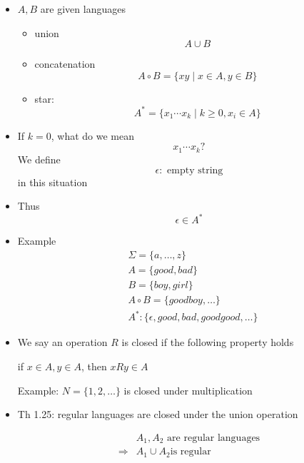 \begin{frame}[allowframebreaks]
\begin{itemize}
\item [] $A,B$ are given languages
\begin{itemize}
\item union
  \begin{equation*}
  A \cup B
\end{equation*}
\item concatenation
  \begin{equation*}
  A\circ B=\{xy\mid x\in A, y \in B\}
\end{equation*}
\item star:
  \begin{equation*}
  A^*=\{x_1 \cdots x_k\mid
k \geq 0, x_i \in A\}
\end{equation*}
\end{itemize}
\item If $k=0$, what do we mean
  \begin{equation*}
    x_1 \cdots x_k?
  \end{equation*}
  We define
  \begin{equation*}
     \epsilon: \text{ empty string}
   \end{equation*}
in this situation
\item Thus
  \begin{equation*}
   \epsilon \in A^*
 \end{equation*}
\item Example
  \begin{equation*}
    \begin{split}
& \Sigma =\{a, \ldots, z\}\\
& A=\{good, bad\} \\
& B=\{boy,girl\} \\
& A\circ B=
\{goodboy, \ldots \}\\
& A^*: \{\epsilon, good, bad, goodgood, \ldots\}
\end{split}
\end{equation*}
\item We say an operation $R$ is \alert{closed} if the
  following property holds
  \begin{center}
if $x\in A, y \in A$, then $xRy \in A$
\end{center}
Example: $N=\{1,2,\ldots\}$ is closed under multiplication
\item Th 1.25: regular languages are closed under the union operation

  \begin{equation*}
    \begin{split}
&    A_1, A_2 \text{ are regular languages} \\
\Rightarrow & A_1 \cup A_2 \text{is regular}
  \end{split}
\end{equation*}


\end{itemize}
\end{frame}
